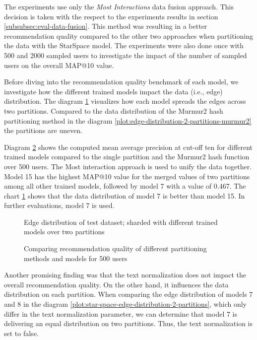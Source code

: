 The experiments use only the \emph{Most Interactions} data fusion approach. This decision is taken with the respect to the experiments results in section \ref{subsubsec:eval-data-fusion}. This method was resulting in a better recommendation quality compared to the other two approaches when partitioning the data with the StarSpace model. The experiments were also done once with 500 and 2000 sampled users to investigate the impact of the number of sampled users on the overall MAP@10 value.

Before diving into the recommendation quality benchmark of each model, we investigate how the different trained models impact the data (i.e., edge) distribution. The diagram \ref{plot:edge-distribution} visualizes how each model spreads the edges across two partitions. Compared to the data distribution of the Murmur2 hash partitioning method in the diagram \ref{plot:edge-distribution-2-partitions-murmur2} the partitions are uneven.


Diagram \ref{plot:hyperparameter-recommendation-quality} shows the computed mean average precision at cut-off ten for different trained models compared to the single partition and the Murmur2 hash function over 500 users. The Most interaction approach is used to unify the data together. Model 15 has the highest MAP@10 value for the merged values of two partitions among all other trained models, followed by model 7 with a value of 0.467. The chart \ref{plot:edge-distribution} shows that the data distribution of model 7 is better than model 15. In further evaluations, model 7 is used.


\begin{figure}[!htb]
    \centering
    
    \caption{Edge distribution of test dataset; sharded with different trained models over two partitions}
    \label{plot:edge-distribution}
\end{figure}

\begin{figure}[!htb]
    \centering
    
    \caption{Comparing recommendation quality of different partitioning methods and models for 500 users}
    \label{plot:hyperparameter-recommendation-quality}
\end{figure}


Another promising finding was that the text normalization does not impact the overall recommendation quality. On the other hand, it influences the data distribution on each partition. When comparing the edge distribution of models 7 and 8 in the diagram \ref{plot:star-space-edge-distribution-2-partitions}, which only differ in the text normalization parameter, we can determine that model 7 is delivering an equal distribution on two partitions. Thus, the text normalization is set to false. 


